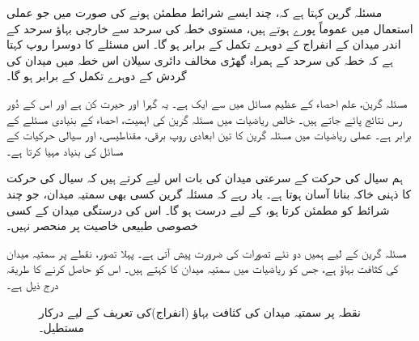مسئلہ گرین کہتا ہے کہ، چند ایسے شرائط مطمئن ہونے کی صورت میں جو عملی استعمال میں عموماً پورے ہوتے ہیں، مستوی خطہ کی سرحد سے خارجی بہاؤ سرحد کے اندر  میدان کے  انفراج کے  دوہرے تکمل کے برابر ہو گا۔  اس مسئلے کا دوسرا روپ کہتا ہے کہ خطہ کی سرحد کے ہمراہ گھڑی مخالف دائری سیلان اس خطہ میں میدان کی گردش کے دوہرے  تکمل کے برابر ہو گا۔ 

مسئلہ گرین، علم احصاء کے عظیم مسائل میں سے ایک ہے۔ یہ گہرا اور حیرت کن ہے اور اس کے  دُور رس نتائج  پائے جاتے ہیں۔ خالص ریاضیات میں مسئلہ گرین کی اہمیت، احصاء کے بنیادی مسئلے کے برابر ہے۔ عملی ریاضیات میں مسئلہ گرین کا تین ابعادی روپ برقی، مقناطیسی، اور سیالی حرکیات کے مسائل کی  بنیاد مہیا کرتا ہے۔  

ہم سیال کی حرکت کے سرعتی میدان  کی بات اس لیے کرتے ہیں کہ سیال کی حرکت کا ذہنی خاکہ بنانا آسان ہوتا ہے۔ یاد رہے کہ مسئلہ گرین کسی بھی سمتیہ میدان، جو چند شرائط کو مطمئن کرتا ہو، کے لیے درست ہو گا۔ اس کی درستگی میدان کے کسی خصوصی طبیعی خاصیت   پر منحصر نہیں۔  


مسئلہ گرین کے لیے ہمیں دو نئے تصورات کی ضرورت پیش آتی ہے۔ پہلا تصور،  نقطے پر سمتیہ میدان کی کثافت بہاؤ ہے،  جس کو ریاضیات میں سمتیہ میدان کا  کہتے ہیں۔ اس کو حاصل کرنے کا طریقہ درج ذیل ہے۔

\begin{figure}
\centering
{}
\caption
{نقطہ  پر سمتیہ میدان کی کثافت بہاؤ  (انفراج)کی تعریف کے لیے درکار مستطیل۔}
\label{شکل_سمتی_تکمل_بند_راہ_مستطیل}
\end{figure}

